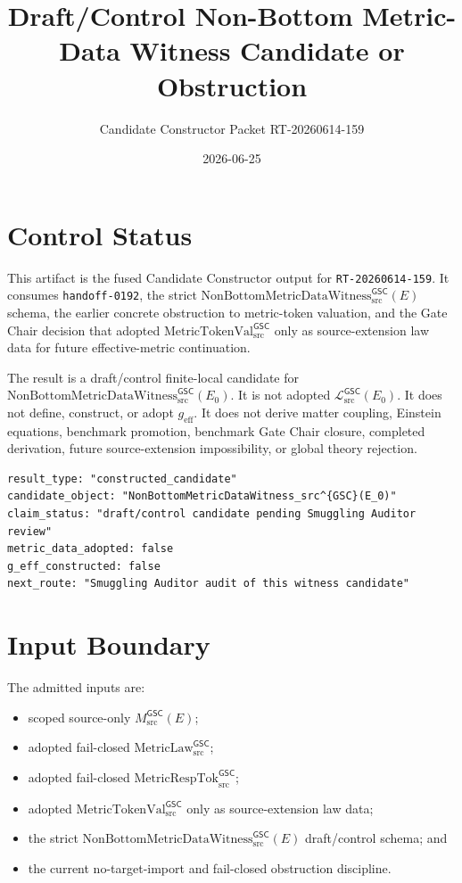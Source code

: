 \documentclass[11pt]{article}
\title{Draft/Control Non-Bottom Metric-Data Witness Candidate or Obstruction}
\author{Candidate Constructor Packet RT-20260614-159}
\date{2026-06-25}
\newcommand{\MsrcGSC}{M_{\mathrm{src}}^{\mathsf{GSC}}}
\newcommand{\MetricLaw}{\mathrm{MetricLaw}_{\mathrm{src}}^{\mathsf{GSC}}}
\newcommand{\MetricRespTok}{\mathrm{MetricRespTok}_{\mathrm{src}}^{\mathsf{GSC}}}
\newcommand{\MetricTokenVal}{\mathrm{MetricTokenVal}_{\mathrm{src}}^{\mathsf{GSC}}}
\newcommand{\Witness}{\mathrm{NonBottomMetricDataWitness}_{\mathrm{src}}^{\mathsf{GSC}}}
\newcommand{\MetricData}{\mathcal{L}_{\mathrm{src}}^{\mathsf{GSC}}}
\newcommand{\geff}{g_{\mathrm{eff}}}
\newcommand{\Ezero}{E_{0}}
\begin{document}
\maketitle

\section{Control Status}

This artifact is the fused Candidate Constructor output for
\texttt{RT-20260614-159}. It consumes \texttt{handoff-0192}, the strict
\(\Witness(E)\) schema, the earlier concrete obstruction to metric-token
valuation, and the Gate Chair decision that adopted \(\MetricTokenVal\) only
as source-extension law data for future effective-metric continuation.

The result is a draft/control finite-local candidate for
\(\Witness(\Ezero)\). It is not adopted \(\MetricData(\Ezero)\). It does not
define, construct, or adopt \(\geff\). It does not derive matter coupling,
Einstein equations, benchmark promotion, benchmark Gate Chair closure,
completed derivation, future source-extension impossibility, or global theory
rejection.

\begin{verbatim}
result_type: "constructed_candidate"
candidate_object: "NonBottomMetricDataWitness_src^{GSC}(E_0)"
claim_status: "draft/control candidate pending Smuggling Auditor review"
metric_data_adopted: false
g_eff_constructed: false
next_route: "Smuggling Auditor audit of this witness candidate"
\end{verbatim}

\section{Input Boundary}

The admitted inputs are:
\begin{itemize}[leftmargin=*]
  \item scoped source-only \(\MsrcGSC(E)\);
  \item adopted fail-closed \(\MetricLaw\);
  \item adopted fail-closed \(\MetricRespTok\);
  \item adopted \(\MetricTokenVal\) only as source-extension law data;
  \item the strict \(\Witness(E)\) draft/control schema; and
  \item the current no-target-import and fail-closed obstruction discipline.
\end{itemize}
\end{document}
